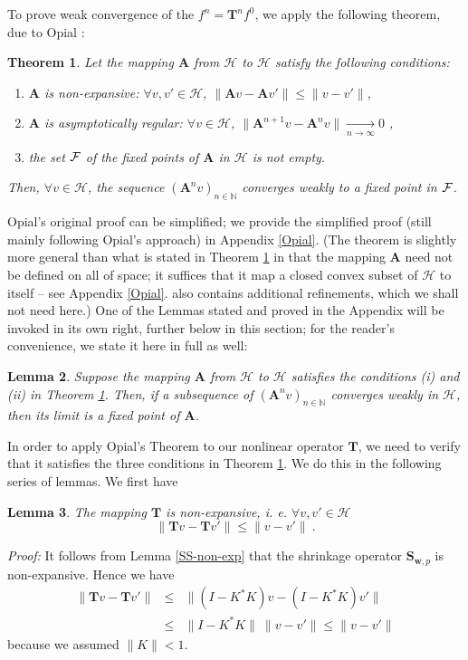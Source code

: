 \documentclass[10pt]{article}
\newtheorem{theorem}{Theorem}[section]
\newtheorem{lemma}[theorem]{Lemma}
\newcommand{\QED}{\hfill \raisebox{-2pt}{\rule{5.6pt}{8pt}\rule{4pt}{0pt}}%
  \smallskip\par}
\def\N{\mathbb{N}}
\def\S{\mathbf{S}}
\def\T{\mathbf{T}}
\def\A{\mathbf{A}}
\def\cH{\mathcal{H}}
\begin{document}
To prove weak convergence of the $f^n=\T^n f^0$, we apply the following
theorem, due to
Opial \cite{Opi67}:
\begin{theorem}
\label{thm_opial}
Let
the mapping $\A $ from $\cH$ to $\cH$ satisfy the following
conditions:
\begin{enumerate}
\item[{\rm (i)}] $\A $ is non-expansive: $\forall v, v' \in \cH$,
$\| \A  v -  \A  v'\| \leq \| v - v'\|$,
\item[{\rm (ii)}] $\A $ is asymptotically regular: $\forall v \in \cH$,
$\| \A ^{n+1}v -\A ^n v\|
\xrightarrow[n \to \infty ]{~}  0$ ,
\item[{\rm (iii)}] the set ${\cal F}$ of the fixed points of $\A $ in
${\cH}$ is
not empty.
\end{enumerate}
Then, $\forall v \in \cH$, the sequence $(\A ^n v)_{n \in \N}$
converges weakly to a fixed point in ${\cal F}$.
\end{theorem}

Opial's original proof can be simplified;
we provide the simplified proof (still mainly
following Opial's approach) in Appendix \ref{Opial}.
(The theorem is slightly more general than what is stated
in Theorem \ref{thm_opial} in that the mapping $\A $ need not be
defined on all of space; it suffices that it map a closed convex subset of
$\cH$ to itself -- see Appendix \ref{Opial}.
\cite{Opi67} also contains additional refinements,
which we shall not need here.)
One of the Lemmas stated and proved in the Appendix
will be invoked in its own right, further below in this section;
for the reader's convenience, we state
it here in full as well:

\begin{lemma}
\label{lem-3-2}
Suppose the mapping $\A$ from $\cH$
to $\cH$ satisfies the conditions {\rm (i)} and {\rm (ii)}
in Theorem {\rm\ref{thm_opial}}. Then, if
a subsequence of $(\A ^n v)_{n\in \mathbb{N}}$
converges weakly in $\cH$, then its limit is a fixed point of $\A$.
\end{lemma}

In order to apply Opial's Theorem to our nonlinear operator
$\T$, we need to verify that it satisfies the three conditions in Theorem
\ref{thm_opial}. We do this in the following series of lemmas. We first have

\begin{lemma}
\label{nonexp}
The mapping $\T$ is non-expansive, i. e. $\forall v, v' \in \cH$
\begin{equation*}
\|\T  v -  \T  v' \| \leq \| v - v' \| \ .
\end{equation*}
\end{lemma}
{\em Proof:}
It follows from Lemma \ref{SS-non-exp}
that the shrinkage operator ${\S_{\mathbf{w},p}}$ is
non-expansive. Hence we have
\begin{eqnarray*}
\|{\T} v - {\T} v' \| &\leq& \| (I-K^*K) v - (I-K^*K)
v' \|\\
&\leq& \| I-K^*K  \|\ \| v - v' \|  \leq \| v - v' \|
\end{eqnarray*}
because we assumed $\| K \| < 1$.
\hfill\QED\bigskip
\end{document}
